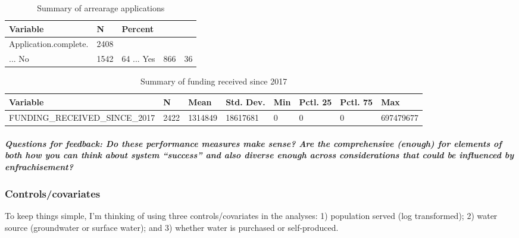 \documentclass[
]{article}
\begin{document}
\begin{table}

\caption{\label{tab:tabular overview of DVs}Summary of arrearage applications}
\centering
\begin{tabular}[t]{lll}
\toprule
Variable & N & Percent\\
\midrule
Application.complete. & 2408 & \\
... No & 1542 & 64%
... Yes & 866 & 36%
\bottomrule
\end{tabular}
\end{table}

\begin{table}

\caption{\label{tab:tabular overview of DVs}Summary of funding received since 2017}
\centering
\begin{tabular}[t]{llllllll}
\toprule
Variable & N & Mean & Std. Dev. & Min & Pctl. 25 & Pctl. 75 & Max\\
\midrule
FUNDING_RECEIVED_SINCE_2017 & 2422 & 1314849 & 18617681 & 0 & 0 & 0 & 697479677\\
\bottomrule
\end{tabular}
\end{table}

\hypertarget{questions-for-feedback-do-these-performance-measures-make-sense-are-the-comprehensive-enough-for-elements-of-both-how-you-can-think-about-system-success-and-also-diverse-enough-across-considerations-that-could-be-influenced-by-enfrachisement}{%
\subparagraph{Questions for feedback: Do these performance measures make
sense? Are the comprehensive (enough) for elements of both how you can
think about system ``success'' and also diverse enough across
considerations that could be influenced by
enfrachisement?}\label{questions-for-feedback-do-these-performance-measures-make-sense-are-the-comprehensive-enough-for-elements-of-both-how-you-can-think-about-system-success-and-also-diverse-enough-across-considerations-that-could-be-influenced-by-enfrachisement}}

\hypertarget{controlscovariates}{%
\subsubsection{Controls/covariates}\label{controlscovariates}}

To keep things simple, I'm thinking of using three controls/covariates
in the analyses: 1) population served (log transformed); 2) water source
(groundwater or surface water); and 3) whether water is purchased or
self-produced.
\end{document}
